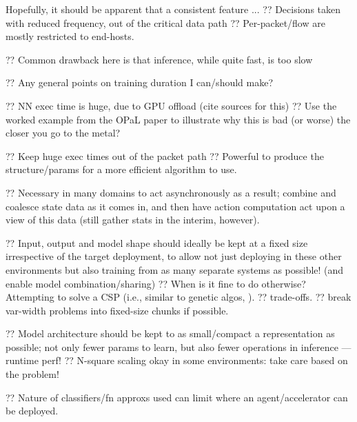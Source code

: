 Hopefully, it should be apparent that a consistent feature ...
?? Decisions taken with reduced frequency, out of the critical data path
?? Per-packet/flow are mostly restricted to end-hosts.

?? Common drawback here is that inference, while quite fast, is too slow 

?? Any general points on training duration I can/should make?

?? NN exec time is huge, due to GPU offload (cite sources for this)
?? Use the worked example from the OPaL paper to illustrate why this is bad (or worse) the closer you go to the metal?

?? Keep huge exec times out of the packet path
?? Powerful to produce the structure/params for a more efficient algorithm to use.

?? Necessary in many domains to act asynchronously as a result; combine and coalesce state data as it comes in, and then have action computation act upon a view of this data (still gather stats in the interim, however).

?? Input, output and model shape should ideally be kept at a fixed size irrespective of the target deployment, to allow not just deploying in these other environments but also training from as many separate systems as possible! (and enable model combination/sharing)
?? When is it fine to do otherwise? Attempting to solve a CSP (i.e., similar to genetic algos, ).
?? trade-offs.
?? break var-width problems into fixed-size chunks if possible.

?? Model architecture should be kept to as small/compact a representation as possible; not only fewer params to learn, but also fewer operations in inference --- runtime perf!
?? N-square scaling okay in some environments: take care based on the problem!

?? Nature of classifiers/fn approxs used can limit where an agent/accelerator can be deployed.
